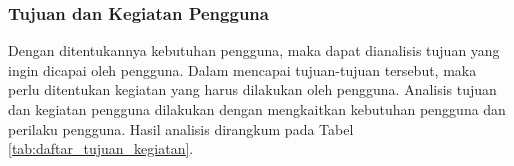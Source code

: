 \FloatBarrier

\subsubsection{Tujuan dan Kegiatan Pengguna}
\label{subsubsec:tujuan_kegiatan_pengguna}

Dengan ditentukannya kebutuhan pengguna, maka dapat dianalisis tujuan yang ingin dicapai oleh pengguna. Dalam mencapai tujuan-tujuan tersebut, maka perlu ditentukan kegiatan yang harus dilakukan oleh pengguna. Analisis tujuan dan kegiatan pengguna dilakukan dengan mengkaitkan kebutuhan pengguna dan perilaku pengguna. Hasil analisis dirangkum pada Tabel \ref{tab:daftar_tujuan_kegiatan}.

\newlength{\cccolgoal}
\setlength{\cccolgoal}{0.3\textwidth}

\newlength{\cccolneed}
\setlength{\cccolneed}{0.13\textwidth}

\newcommand{\ccgoal}[2]{\multirow{#1}{\cccolgoal}{\linespread{1}\selectfont #2}}
\newcommand{\ccneed}[2]{\multirow{#1}{\cccolneed}{\centering\linespread{1}\selectfont #2}}
\newcommand{\ccline}{\hhline{|-|~|-|~|}}

\newpage

\FloatBarrier

